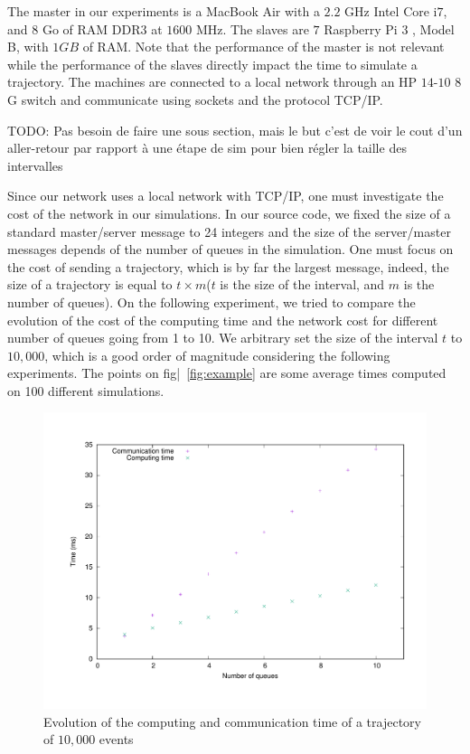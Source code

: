 \documentclass[a4paper,10pt]{article}
\newcommand{\todo}[1]{{\color{red} TODO: {#1}}}
\begin{document}
The master in our experiments is a MacBook Air with a $2.2$ GHz Intel Core i$7$, and $8$ Go of RAM DDR$3$ at $1600$ MHz.
The slaves are $7$ Raspberry Pi $3$ , Model B, with $1GB$ of RAM. Note that the performance of the master is not relevant
while the performance of the slaves directly impact the time to simulate a trajectory. The machines are connected to a local network through an HP $14$-$10$ $8$G switch and communicate using sockets and the protocol TCP/IP. 


\todo{Pas besoin de faire une sous section, mais le but c'est de voir le cout d'un aller-retour par rapport à une étape de sim
pour bien régler la taille des intervalles}

Since our network uses a local network with TCP/IP, one must investigate the cost of the network in our simulations. 
In our source code, we fixed the size of a standard master/server message to 24 integers and the size of the server/master messages depends of the number of queues in the simulation. One must focus on the cost of sending a trajectory, which is by far the largest message, indeed, the size of a trajectory is equal to $t \times m$($t$ is the size of the interval, and $m$ is the number of queues). On the following experiment, we tried to compare the evolution of the cost of the computing time and the network cost for different number of queues going from 1 to 10. We arbitrary set the size of the interval $t$ to $10,000$, which is a good order of magnitude considering the following experiments. The points on fig|~\ref{fig:example} are some average times computed on 100 different simulations.

\begin{figure}[h]
\centering
 \includegraphics[scale=0.45]{time_traj.pdf}
 \caption{Evolution of the computing and communication time of a trajectory of $10,000$ events}
\end{figure}
\end{document}
